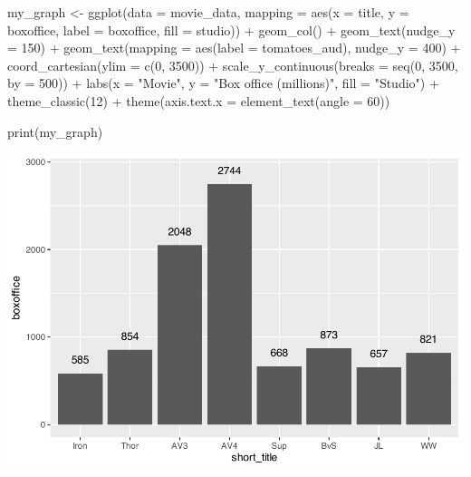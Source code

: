 \documentclass[
]{krantz}
\makeatletter
\newenvironment{Shaded}{\begin{snugshade}}{\end{snugshade}}
\newcommand{\AttributeTok}[1]{\textcolor[rgb]{0.61,0.61,0.61}{#1}}
\newcommand{\DecValTok}[1]{\textcolor[rgb]{0.06,0.06,0.06}{#1}}
\newcommand{\FunctionTok}[1]{\textcolor[rgb]{0,0,0}{#1}}
\newcommand{\NormalTok}[1]{#1}
\newcommand{\OtherTok}[1]{\textcolor[rgb]{0.37,0.37,0.37}{#1}}
\newcommand{\SpecialCharTok}[1]{\textcolor[rgb]{0,0,0}{#1}}
\newcommand{\StringTok}[1]{\textcolor[rgb]{0.5,0.5,0.5}{#1}}
\newenvironment{kframe}{%
\medskip{}
\setlength{\fboxsep}{.8em}
 \def\at@end@of@kframe{}%
 \ifinner\ifhmode%
  \def\at@end@of@kframe{\end{minipage}}%
  \begin{minipage}{\columnwidth}%
 \fi\fi%
 \def\FrameCommand##1{\hskip\@totalleftmargin \hskip-\fboxsep
 \colorbox{shadecolor}{##1}\hskip-\fboxsep
     \hskip-\linewidth \hskip-\@totalleftmargin \hskip\columnwidth}%
 \MakeFramed {\advance\hsize-\width
   \@totalleftmargin\z@ \linewidth\hsize
   \@setminipage}}%
 {\par\unskip\endMakeFramed%
 \at@end@of@kframe}
\renewenvironment{Shaded}{\begin{kframe}}{\end{kframe}}
\makeatother
\begin{document}
\begin{Shaded}
\begin{Highlighting}[]
\NormalTok{my\_graph }\OtherTok{\textless{}{-}} \FunctionTok{ggplot}\NormalTok{(}\AttributeTok{data =}\NormalTok{ movie\_data,}
           \AttributeTok{mapping =} \FunctionTok{aes}\NormalTok{(}\AttributeTok{x =}\NormalTok{ title,}
                         \AttributeTok{y =}\NormalTok{ boxoffice,}
                         \AttributeTok{label =}\NormalTok{ boxoffice, }
                         \AttributeTok{fill =}\NormalTok{ studio)) }\SpecialCharTok{+}
  \FunctionTok{geom\_col}\NormalTok{() }\SpecialCharTok{+}
  \FunctionTok{geom\_text}\NormalTok{(}\AttributeTok{nudge\_y =} \DecValTok{150}\NormalTok{)  }\SpecialCharTok{+}
  \FunctionTok{geom\_text}\NormalTok{(}\AttributeTok{mapping =} \FunctionTok{aes}\NormalTok{(}\AttributeTok{label =}\NormalTok{ tomatoes\_aud), }
            \AttributeTok{nudge\_y =} \DecValTok{400}\NormalTok{) }\SpecialCharTok{+}
  \FunctionTok{coord\_cartesian}\NormalTok{(}\AttributeTok{ylim =} \FunctionTok{c}\NormalTok{(}\DecValTok{0}\NormalTok{, }\DecValTok{3500}\NormalTok{)) }\SpecialCharTok{+}
  \FunctionTok{scale\_y\_continuous}\NormalTok{(}\AttributeTok{breaks =} \FunctionTok{seq}\NormalTok{(}\DecValTok{0}\NormalTok{, }\DecValTok{3500}\NormalTok{, }\AttributeTok{by =} \DecValTok{500}\NormalTok{)) }\SpecialCharTok{+}
  \FunctionTok{labs}\NormalTok{(}\AttributeTok{x =} \StringTok{"Movie"}\NormalTok{,}
       \AttributeTok{y =} \StringTok{"Box office (millions)"}\NormalTok{,}
       \AttributeTok{fill =} \StringTok{"Studio"}\NormalTok{) }\SpecialCharTok{+}
  \FunctionTok{theme\_classic}\NormalTok{(}\DecValTok{12}\NormalTok{) }\SpecialCharTok{+}
  \FunctionTok{theme}\NormalTok{(}\AttributeTok{axis.text.x =} \FunctionTok{element\_text}\NormalTok{(}\AttributeTok{angle =} \DecValTok{60}\NormalTok{))}

\FunctionTok{print}\NormalTok{(my\_graph)}
\end{Highlighting}
\end{Shaded}

\includegraphics[width=0.65\linewidth]{bookdown_files/figure-latex/unnamed-chunk-117-1}
\end{document}
